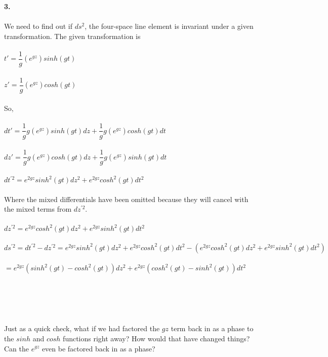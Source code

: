 \documentclass[prb,preprint]
{revtex4-1}
\begin{document}
\textbf{3.}
\\
\\
We need to find out if $ds^2$, the four-space line element is invariant under a given transformation.
The given transformation is 
\\
\\
$t' = \dfrac{1}{g}\left(e^{gz}\right)sinh\left(gt\right)$
\\
\\
$z' = \dfrac{1}{g}\left(e^{gz}\right)cosh\left(gt\right)$
\\
\\
So,
\\
\\
$dt' = \dfrac{1}{g}g\left(e^{gz}\right)sinh\left(gt\right)dz + \dfrac{1}{g}g\left(e^{gz}\right)cosh\left(gt\right)dt$
\\
\\
$dz' = \dfrac{1}{g}g\left(e^{gz}\right)cosh\left(gt\right)dz + \dfrac{1}{g}g\left(e^{gz}\right)sinh\left(gt\right)dt$
\\
\\
$dt^{\prime 2} = e^{2gz}sinh^2\left(gt\right)dz^2 + e^{2gz}cosh^2\left(gt\right)dt^2$
\\
\\
Where the mixed differentials have been omitted because they will cancel with the mixed terms from $dz^{\prime 2}$.
\\
\\
$dz^{\prime 2} = e^{2gz}cosh^2\left(gt\right)dz^2 + e^{2gz}sinh^2\left(gt\right)dt^2$
\\
\\
$ds^{\prime 2} = dt^{\prime 2} - dz^{\prime 2} = e^{2gz}sinh^2\left(gt\right)dz^2 + e^{2gz}cosh^2\left(gt\right)dt^2 - \left(e^{2gz}cosh^2\left(gt\right)dz^2 + e^{2gz}sinh^2\left(gt\right)dt^2\right)$
\\
\\
$= e^{2gz}\left(sinh^2\left(gt\right) - cosh^2\left(gt\right)\right)dz^2 + e^{2gz}\left(cosh^2\left(gt\right) - sinh^2\left(gt\right)\right)dt^2$
\\
\\
\\
\\
\\
\\
Just as a quick check, what if we had factored the $gz$ term back in as a phase to the $sinh$ and $cosh$ functions right away?  How would that have changed things?  Can the $e^{gz}$ even be factored back in as a phase?
\end{document}
